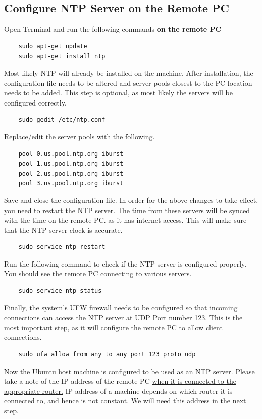 \documentclass[12]{article}
\begin{document}
\subsection{Configure NTP Server on the Remote PC} 
Open Terminal and run the following commands \textbf{on the remote PC}
\begin{lstlisting}
	sudo apt-get update
	sudo apt-get install ntp
\end{lstlisting}
Most likely NTP will already be installed on the machine. After installation, the configuration file needs to be altered and server pools closest to the PC location needs to be added. This step is optional, as most likely the servers will be configured correctly.
\begin{lstlisting}
	sudo gedit /etc/ntp.conf
\end{lstlisting}
Replace/edit the server pools with the following.
\begin{lstlisting}
	pool 0.us.pool.ntp.org iburst
	pool 1.us.pool.ntp.org iburst
	pool 2.us.pool.ntp.org iburst
	pool 3.us.pool.ntp.org iburst
\end{lstlisting}
Save and close the configuration file. In order for the above changes to take effect, you need to restart the NTP server. The time from these servers will be synced with the time on the remote PC. as it has internet access. This will make sure that the NTP server clock is accurate.
\begin{lstlisting}
    sudo service ntp restart
\end{lstlisting}
Run the following command to check if the NTP server is configured properly. You should see the remote PC connecting to various servers.
\begin{lstlisting}
    sudo service ntp status
\end{lstlisting}
Finally, the system’s UFW firewall needs to be configured so that incoming connections can access the NTP server at UDP Port number 123. This is the most important step, as it will configure the remote PC to allow client connections.
\begin{lstlisting}
    sudo ufw allow from any to any port 123 proto udp
\end{lstlisting}
Now the Ubuntu host machine is configured to be used as an NTP server. Please take a note of the IP address of the remote PC \underline{when it is connected to the appropriate router.} IP address of a machine depends on which router it is connected to, and hence is not constant. We will need this address in the next step.
\end{document}

